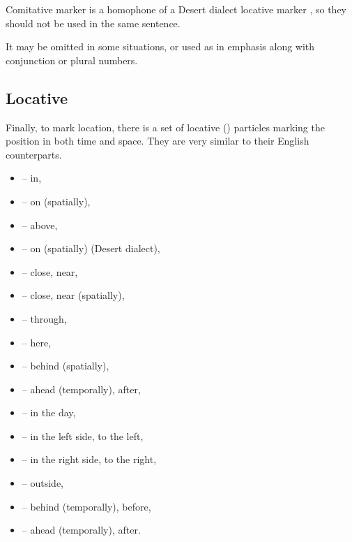 Comitative marker is a homophone of a Desert dialect locative marker ,
so they should not be used in the same sentence.

It may be omitted in some situations, or used as in emphasis along with
conjunction or plural numbers.




\subsection{Locative}

Finally, to mark location, there is a set of locative (\Loc{}) particles marking
the position in both time and space. They are very similar to their English
counterparts.

\begin{itemize}
    \item {} -- in,
    \item {} -- on (spatially),
    \item {} -- above,
    \item {} -- on (spatially) (Desert dialect),
    \item {} -- close, near,
    \item {} -- close, near (spatially),
    \item {} -- through,
    \item {} -- here,
    \item {} -- behind (spatially),
    \item {} -- ahead (temporally), after,
    \item {} -- in the day,
    \item {} -- in the left side, to the left,
    \item {} -- in the right side, to the right,
    \item {} -- outside,
    \item {} -- behind (temporally), before,
    \item {} -- ahead (temporally), after.
\end{itemize}

